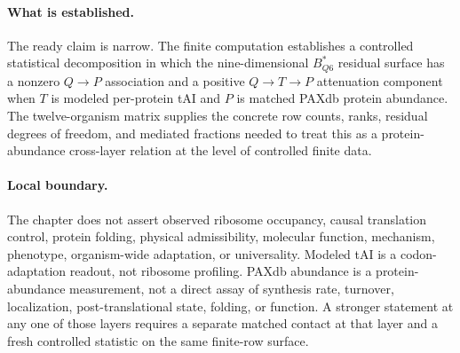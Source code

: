 \paragraph{What is established.}
The ready claim is narrow.  The finite computation establishes a controlled statistical decomposition in which the nine-dimensional $B^{\ast}_{Q6}$ residual surface has a nonzero $Q \to P$ association and a positive $Q \to T \to P$ attenuation component when $T$ is modeled per-protein tAI and $P$ is matched PAXdb protein abundance.  The twelve-organism matrix supplies the concrete row counts, ranks, residual degrees of freedom, and mediated fractions needed to treat this as a protein-abundance cross-layer relation at the level of controlled finite data.

\paragraph{Local boundary.}
The chapter does not assert observed ribosome occupancy, causal translation control, protein folding, physical admissibility, molecular function, mechanism, phenotype, organism-wide adaptation, or universality.  Modeled tAI is a codon-adaptation readout, not ribosome profiling.  PAXdb abundance is a protein-abundance measurement, not a direct assay of synthesis rate, turnover, localization, post-translational state, folding, or function.  A stronger statement at any one of those layers requires a separate matched contact at that layer and a fresh controlled statistic on the same finite-row surface.
